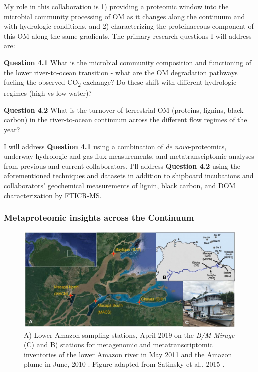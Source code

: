 \documentclass[12pt, letterpaper, twoside]{article}
\begin{document}
My role in this collaboration is 1) providing a proteomic window into the microbial community processing of OM as it changes along the continuum and with hydrologic conditions, and 2) characterizing the proteinaceous component of this OM along the same gradients. The primary research questions I will address are:

\bigskip

\textbf{Question 4.1} What is the microbial community composition and functioning of the lower river-to-ocean transition - what are the OM degradation pathways fueling the observed CO\textsubscript{2} exchange? Do these shift with different hydrologic regimes (high vs low water)?

\bigskip

\textbf{Question 4.2} What is the turnover of terrestrial OM (proteins, lignins, black carbon) in the river-to-ocean continuum across the different flow regimes of the year? 

\bigskip

I will address \textbf{Question 4.1} using a combination of \textit{de novo}-proteomics, underway hydrologic and gas flux measurements, and metatransciptomic analyses from previous \cite{doherty_bacterial_2017, satinsky_amazon_2014} and current collaborators. I'll address \textbf{Question 4.2} using the aforementioned techniques and datasets in addition to shipboard incubations and collaborators' geochemical measurements of lignin, black carbon, and DOM characterization by FTICR-MS.

\subsubsection{Metaproteomic insights across the Continuum}

\begin{figure}
	\includegraphics[width=\linewidth]{amazon-sta-map.jpg}
	\caption{A) Lower Amazon sampling stations, April 2019 on the \textit{B/M Mirage } (C) and B) stations for metagenomic and metatranscriptomic inventories of the lower Amazon river \cite{satinsky_metagenomic_2015} in May 2011 and the Amazon plume in June, 2010 \cite{satinsky_amazon_2014}. Figure adapted from Satinsky et al., 2015 \cite{satinsky_metagenomic_2015}.}
	\label{fig:amazon-stations}
\end{figure}
\end{document}
